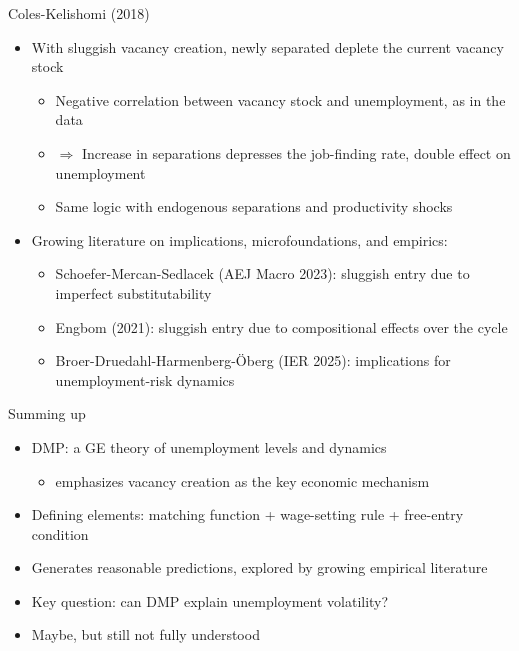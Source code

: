 \documentclass[9pt]{beamer}
\newcommand{\bit}{\begin{itemize}}
\newcommand{\eit}{\end{itemize}}
\begin{document}
\begin{frame}{Coles-Kelishomi (2018)}

\bit
\setlength\itemsep{1.5em}

\item With sluggish vacancy creation, newly separated deplete the current vacancy stock
\bit
\setlength\itemsep{0.5em}
	\item Negative correlation between vacancy stock and unemployment, as in the data
	
	\item $\Rightarrow$ Increase in separations depresses the job-finding rate, double effect on unemployment
	
	\item Same logic with endogenous separations and productivity shocks
\eit

\item Growing literature on implications, microfoundations, and empirics:
\bit
\setlength\itemsep{0.5em}
\item Schoefer-Mercan-Sedlacek (AEJ Macro 2023): sluggish entry due to imperfect substitutability

\item Engbom (2021): sluggish entry due to compositional effects over the cycle
	
\item Broer-Druedahl-Harmenberg-{\"O}berg (IER 2025): implications for unemployment-risk dynamics
\eit

\eit
\end{frame}




\begin{frame}{Summing up}

\bit
\setlength\itemsep{1.5em}

\item DMP: a GE theory of unemployment levels and dynamics
\bit
\item emphasizes vacancy creation as the key economic mechanism
\eit

\item Defining elements: matching function + wage-setting rule + free-entry condition

\item Generates reasonable predictions, explored by growing empirical literature

\item Key question: can DMP explain unemployment volatility?

\item Maybe, but still not fully understood

\eit
\end{frame}
\end{document}
